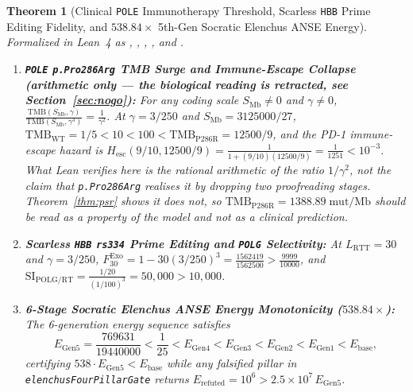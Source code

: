 \documentclass[11pt,a4paper]{article}
\newtheorem{theorem}{Theorem}[section]
\theoremstyle{definition}
\theoremstyle{remark}
\begin{document}
\begin{theorem}[Clinical \texttt{POLE} Immunotherapy Threshold, Scarless \texttt{HBB} Prime Editing Fidelity, and $538.84\times$ 5th-Gen Socratic Elenchus ANSE Energy]
\label{thm:sec10_humanitarian_elenchus}
Formalized in Lean~4 as , , , , and .
\begin{enumerate}
  \item \textbf{\texttt{POLE} \texttt{p.Pro286Arg} TMB Surge and Immune-Escape Collapse \emph{(arithmetic only --- the biological reading is retracted, see Section~\ref{sec:nogo})}:} For any coding scale $S_{\mathrm{Mb}} \neq 0$ and $\gamma \neq 0$, $\frac{\mathrm{TMB}(S_{\mathrm{Mb}}, \gamma)}{\mathrm{TMB}(S_{\mathrm{Mb}}, \gamma^3)} = \frac{1}{\gamma^2}$. At $\gamma = 3/250$ and $S_{\mathrm{Mb}} = 3125000/27$, $\mathrm{TMB}_{\mathrm{WT}} = 1/5 < 10 < 100 < \mathrm{TMB}_{\mathrm{P286R}} = 12500/9$, and the PD-1 immune-escape hazard is $H_{\mathrm{esc}}(9/10, 12500/9) = \frac{1}{1 + (9/10)(12500/9)} = \frac{1}{1251} < 10^{-3}$. What Lean verifies here is the rational arithmetic of the ratio $1/\gamma^2$, not the claim that \texttt{p.Pro286Arg} realises it by dropping two proofreading stages. Theorem~\ref{thm:psr} shows it does not, so $\mathrm{TMB}_{\mathrm{P286R}} = 1388.89\;\mathrm{mut/Mb}$ should be read as a property of the model and not as a clinical prediction.
  \item \textbf{Scarless \texttt{HBB} \texttt{rs334} Prime Editing and \texttt{POLG} Selectivity:} At $L_{\mathrm{RTT}} = 30$ and $\gamma = 3/250$, $F_{30}^{\mathrm{Exo}} = 1 - 30(3/250)^3 = \frac{1562419}{1562500} > \frac{9999}{10000}$, and $\mathrm{SI}_{\mathrm{POLG/RT}} = \frac{1/20}{(1/100)^3} = 50{,}000 > 10{,}000$.
  \item \textbf{6-Stage Socratic Elenchus ANSE Energy Monotonicity ($538.84\times$):} The 6-generation energy sequence satisfies
  \begin{equation}
    E_{\mathrm{Gen5}} = \frac{769631}{19440000} < \frac{1}{25} < E_{\mathrm{Gen4}} < E_{\mathrm{Gen3}} < E_{\mathrm{Gen2}} < E_{\mathrm{Gen1}} < E_{\mathrm{base}},
  \end{equation}
  certifying $538\cdot E_{\mathrm{Gen5}} < E_{\mathrm{base}}$ while any falsified pillar in \texttt{elenchusFourPillarGate} returns $E_{\mathrm{refuted}} = 10^6 > 2.5\times 10^7\,E_{\mathrm{Gen5}}$.
\end{enumerate}
\end{theorem}
\end{document}
